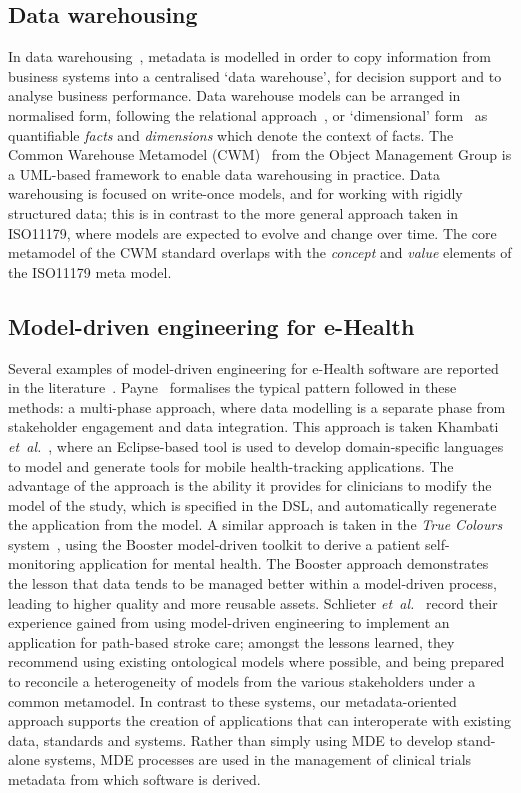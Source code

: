 
\subsection{Data warehousing}

In data warehousing~\cite{kim02}, metadata is modelled in order to copy
information from business systems into a centralised `data warehouse',
for decision support and to analyse business performance. Data
warehouse models can be arranged in normalised form, following the
relational approach~\cite{inm92}, or `dimensional' form~\cite{kim02}
as quantifiable \emph{facts} and \emph{dimensions} which denote the
context of facts. The Common Warehouse Metamodel (CWM)~\cite{poole03}
from the Object Management Group is a UML-based framework to enable
data warehousing in practice. Data warehousing is focused on
write-once models, and for working with rigidly structured data; this
is in contrast to the more general approach taken in ISO11179, where
models are expected to evolve and change over time. 
The core metamodel of the CWM standard overlaps with the 
\emph{concept} and \emph{value} elements of the ISO11179 meta model.

\subsection{Model-driven engineering for e-Health}

Several examples of model-driven engineering for e-Health software are
reported in the literature~\cite{dav14,ragh08,blob07,kham08,schl15}.
Payne~\cite{pay12} formalises the typical pattern followed in these
methods: a multi-phase approach, where data modelling is a separate
phase from stakeholder engagement and data integration. This approach
is taken Khambati \textit{et~al.}~\cite{kham08}, where an
Eclipse-based tool is used to develop domain-specific languages to
model and generate tools for mobile health-tracking applications. The
advantage of the approach is the ability it provides for clinicians to
modify the model of the study, which is specified in the DSL, and
automatically regenerate the application from the model. A similar
approach is taken in the \emph{True Colours} system~\cite{dav14},
using the Booster model-driven toolkit to derive a patient
self-monitoring application for mental health. The Booster approach
demonstrates the lesson that data tends to be managed better within a
model-driven process, leading to higher quality and more reusable
assets.  Schlieter \textit{et~al.}~\cite{schl15} record their
experience gained from using model-driven engineering to implement an
application for path-based stroke care; amongst the lessons learned,
they recommend using existing ontological models where possible, and
being prepared to reconcile a heterogeneity of models from the various
stakeholders under a common metamodel.  In contrast to these systems,
our metadata-oriented approach supports the creation of applications
that can interoperate with existing data, standards and
systems. Rather than simply using MDE to develop stand-alone systems,
MDE processes are used in the management of clinical trials metadata
from which software is derived.

